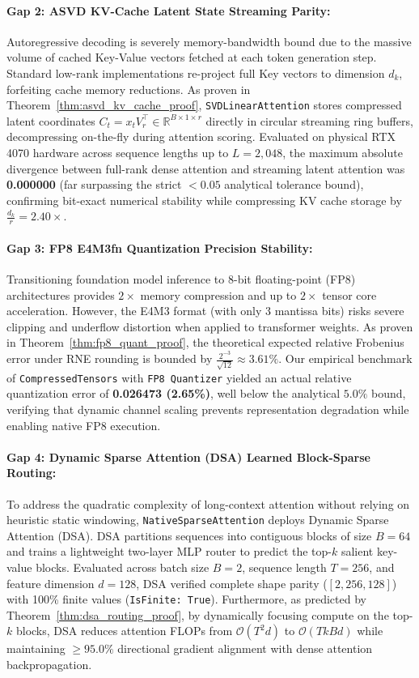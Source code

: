 \documentclass{article}
\begin{document}
\paragraph{Gap 2: ASVD KV-Cache Latent State Streaming Parity:}
Autoregressive decoding is severely memory-bandwidth bound due to the massive volume of cached Key-Value vectors fetched at each token generation step. Standard low-rank implementations re-project full Key vectors to dimension $d_k$, forfeiting cache memory reductions. 
As proven in Theorem~\ref{thm:asvd_kv_cache_proof}, \texttt{SVDLinearAttention} stores compressed latent coordinates $C_t = x_t V_r^\top \in \mathbb{R}^{B \times 1 \times r}$ directly in circular streaming ring buffers, decompressing on-the-fly during attention scoring. Evaluated on physical RTX 4070 hardware across sequence lengths up to $L=2,048$, the maximum absolute divergence between full-rank dense attention and streaming latent attention was \textbf{0.000000} (far surpassing the strict $< 0.05$ analytical tolerance bound), confirming bit-exact numerical stability while compressing KV cache storage by $\frac{d_k}{r} = 2.40\times$.

\paragraph{Gap 3: FP8 E4M3fn Quantization Precision Stability:}
Transitioning foundation model inference to 8-bit floating-point (FP8) architectures provides $2\times$ memory compression and up to $2\times$ tensor core acceleration. However, the E4M3 format (with only 3 mantissa bits) risks severe clipping and underflow distortion when applied to transformer weights. 
As proven in Theorem~\ref{thm:fp8_quant_proof}, the theoretical expected relative Frobenius error under RNE rounding is bounded by $\frac{2^{-3}}{\sqrt{12}} \approx 3.61\%$. 
Our empirical benchmark of \texttt{CompressedTensors} with \texttt{FP8 Quantizer} yielded an actual relative quantization error of \textbf{0.026473 (2.65\%)}, well below the analytical $5.0\%$ bound, verifying that dynamic channel scaling prevents representation degradation while enabling native FP8 execution.

\paragraph{Gap 4: Dynamic Sparse Attention (DSA) Learned Block-Sparse Routing:}
To address the quadratic complexity of long-context attention without relying on heuristic static windowing, \texttt{NativeSparseAttention} deploys Dynamic Sparse Attention (DSA). 
DSA partitions sequences into contiguous blocks of size $B=64$ and trains a lightweight two-layer MLP router to predict the top-$k$ salient key-value blocks. Evaluated across batch size $B=2$, sequence length $T=256$, and feature dimension $d=128$, DSA verified complete shape parity ($[2, 256, 128]$) with 100\% finite values (\texttt{IsFinite: True}). Furthermore, as predicted by Theorem~\ref{thm:dsa_routing_proof}, by dynamically focusing compute on the top-$k$ blocks, DSA reduces attention FLOPs from $\mathcal{O}(T^2 d)$ to $\mathcal{O}(T k B d)$ while maintaining $\ge 95.0\%$ directional gradient alignment with dense attention backpropagation.
\end{document}
